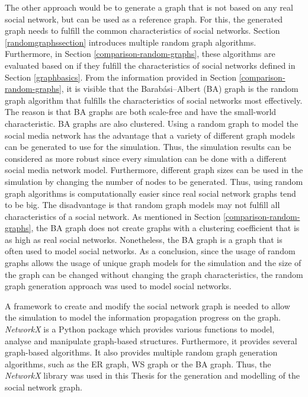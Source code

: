 The other approach would be to generate a graph that is not based
on any real social network, but can be used as a reference graph.
For this, the generated graph needs to fulfill the common
characteristics of social networks.
Section \ref{randomgraphssection} introduces multiple random graph algorithms.
Furthermore, in Section \ref{comparison-random-graphs},
these algorithms are evaluated based on if they fulfill the characteristics
of social networks defined in Section \ref{graphbasics}. 
From the information provided in Section \ref{comparison-random-graphs}, 
it is visible that the Barabási–Albert (BA) graph is the random graph 
algorithm that fulfills the characteristics of social networks most effectively.
The reason is that  BA graphs are both scale-free and have the small-world
characteristic. BA graphs are also clustered.
Using a random graph to model the social media network has the advantage
that a variety of different graph models can be generated to use for 
the simulation. Thus, the simulation results can be considered as more 
robust since every simulation can be done with a different 
social media network model. Furthermore, different graph sizes can be 
used in the simulation by changing the number of nodes to be generated.
Thus, using random graph algorithms is computationally easier since 
real social network graphs tend to be big.
The disadvantage is that random graph models may not fulfill
all characteristics of a social network. As mentioned in 
Section \ref{comparison-random-graphs}, the BA graph
does not create graphs with a clustering coefficient that is as 
high as real social networks. Nonetheless, the BA graph is
a graph that is often used to model social networks.
As a conclusion, since the usage of random graphs allows the usage
of unique graph models for the simulation and the size of the 
graph can be changed without changing the graph characteristics, 
the random graph generation approach was used to model social networks.

A framework to create and modify the social network graph is needed to 
allow the simulation to model the information propagation
progress on the graph. \textit{NetworkX} is a 
Python package which provides various functions to model,
analyse and manipulate graph-based structures. 
Furthermore, it provides several graph-based algorithms.
It also provides multiple random graph generation algorithms,
such as the ER graph, WS graph or the BA graph. 
Thus, the \textit{NetworkX} library was used in this Thesis for
the generation and modelling of the social network graph.


